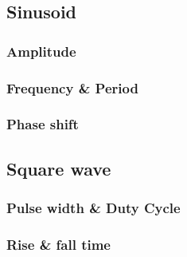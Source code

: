 \subsection{Sinusoid}
\subsubsection{Amplitude}
\subsubsection{Frequency \& Period}
\subsubsection{Phase shift}
\subsection{Square wave}
\subsubsection{Pulse width \& Duty Cycle}
\subsubsection{Rise \& fall time}
